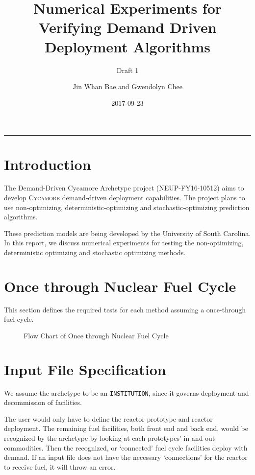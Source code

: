 \documentclass[12pt,letterpaper]{article}
\title{Numerical Experiments for Verifying Demand Driven Deployment Algorithms}
\subtitle{Draft 1}
\author{Jin Whan Bae and Gwendolyn Chee}
\date{2017-09-23}
\newcommand{\Cycamore}{\textsc{Cycamore}\xspace}%
\begin{document}
	
	\maketitle
	\hrule
	\onehalfspacing
	\thispagestyle{empty}

\section*{Introduction}
The Demand-Driven Cycamore Archetype project (NEUP-FY16-10512) aims to develop \Cycamore demand-driven deployment capabilities.
The project plans to use non-optimizing, deterministic-optimizing and stochastic-optimizing prediction algorithms.

These prediction models are being developed by the University of South Carolina. In this report, we discuss numerical experiments for testing the non-optimizing, deterministic optimizing and stochastic optimizing methods. 

\section{Once through Nuclear Fuel Cycle}
This section defines the required tests for
each method assuming a once-through fuel cycle.

\begin{figure}[H]
\caption{Flow Chart of Once through Nuclear Fuel Cycle}
\end{figure}

\section{Input File Specification}
We assume the archetype to be an \texttt{INSTITUTION}, since
it governs deployment and decommission of facilities.

The user would only have to define the reactor prototype and reactor deployment. 
The remaining fuel facilities,
both front end and back end, would be recognized by the archetype
by looking at each prototypes' in-and-out commodities.
Then the recognized, or `connected' fuel cycle facilities deploy
with demand.
If an input file does not have the necessary `connections' for the 
reactor to receive fuel, it will throw an error. 
\end{document}
